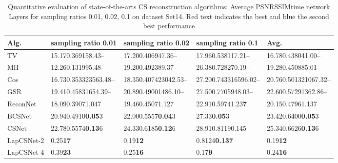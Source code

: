 \documentclass{article}
\begin{document}
\begin{table*}[!t]
\centering

    \vspace{-0.5em}\caption{Quantitative evaluation of state-of-the-arts CS reconstruction algorithms: Average PSNRSSIMtime network Layers for sampling ratios 0.01, 0.02, 0.1 on dataset Set14. {\color{red}Red} text indicates the best and {\color{blue}blue} the second best performance}      \label{tab:results2}
    \renewcommand\arraystretch{1.10}
    \begin{small}
    \begin{tabular}{>{\hfil}p{55pt}<{\hfil}|>{\hfil}p{98pt}<{\hfil}|>{\hfil}p{98pt}<{\hfil}|
    >{\hfil}p{98pt}<{\hfil}|>{\hfil}p{98pt}<{\hfil}}

\hline
{ Alg.} & {  sampling ratio 0.01} & {sampling ratio 0.02} & { sampling ratio 0.1} & {Avg.}      \\
    \hline
    TV~\cite{li1tval3}            & 15.170.369158.43--    &	17.200.406947.36--	& 17.960.538117.21--	&  16.780.438041.00--        \\

MH~\cite{chen2011compressed}            & 12.260.131995.48--	&   19.200.492389.37--  & 26.380.728270.19--	&  19.280.450885.01--        \\

Cos~\cite{zhang2012compressed}            & 16.730.353323563.48-- 	&	18.350.407423042.53--	& 27.200.743316596.02--    &  20.760.501321067.32--     \\

GSR~\cite{zhang2014group}            & 19.410.45831654.39-- 	&	20.890.49001486.10--	& 27.500.7705948.03--	&  22.600.57291362.86--     \\
ReconNet\cite{kulkarni2016reconnet}         & 18.090.39071.047	&	19.460.45071.127	& 22.910.59741.23\textbf{\color{blue}7}	&  20.150.47961.137     \\

BCSNet~\cite{adler2016deep}            & 20.940.4910\textbf{\color{red}0.05}3	&	22.000.5557\textbf{\color{red}0.04}3	& 27.33\textbf{\color{red}0.05}3    &  23.420.6400\textbf{\color{red}0.05}3  	  \\


    CSNet~\cite{shi2017deep}            & 22.780.5574\textbf{\color{blue}0.13}6	&	24.330.6185\textbf{\color{blue}0.12}6	& 28.910.81190.145    &  25.340.6626\textbf{\color{blue}0.13}6  	  \\
LapCSNet-2           & 0.25\textbf{\color{blue}17}    &   0.19\textbf{\color{blue}12}  & 0.8124\textbf{\color{blue}0.13}\textbf{\color{blue}7}    &  0.19\textbf{\color{blue}12}     \\

LapCSNet-4           & 0.39\textbf{\color{red}23}    &   0.25\textbf{\color{red}16}  & 0.17\textbf{\color{red}9}    &  0.24\textbf{\color{red}16}     \\

    \hline
    \end{tabular}
    \end{small}
\end{table*}
\end{document}
